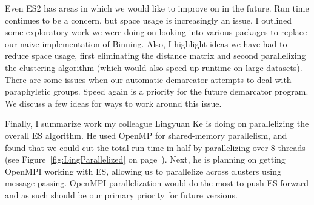 Even ES2 has areas in which we would like to improve on in the future.
Run time continues to be a concern, but space usage is increasingly an issue.
I outlined some exploratory work we were doing on looking into various packages to replace our naive implementation of Binning.
Also, I highlight ideas we have had to reduce space usage, first eliminating the distance matrix and second parallelizing the clustering algorithm (which would also speed up runtime on large datasets).
There are some issues when our automatic demarcator attempts to deal with paraphyletic groups.
Speed again is a priority for the future demarcator program.
We discuss a few ideas for ways to work around this issue.

Finally, I summarize work my colleague Lingyuan Ke is doing on parallelizing the overall ES algorithm.
He used OpenMP for shared-memory parallelism, and found that we could cut the total run time in half by parallelizing over 8 threads (see Figure~\ref{fig:LingParallelized} on page~\pageref{fig:LingParallelized}).
Next, he is planning on getting OpenMPI working with ES, allowing us to parallelize across clusters using message passing.
OpenMPI parallelization would do the most to push ES forward and as such should be our primary priority for future versions.

